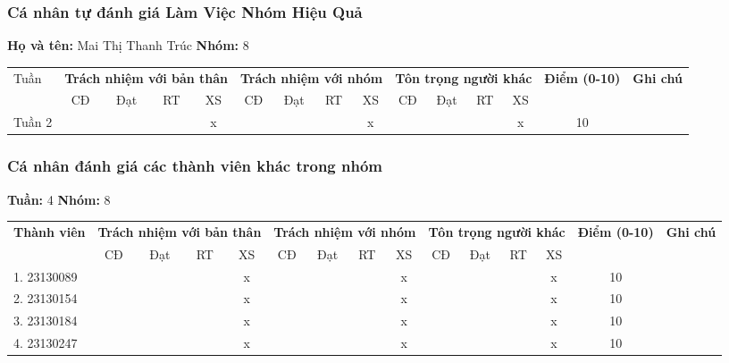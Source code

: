 \subsubsection*{Cá nhân tự đánh giá Làm Việc Nhóm Hiệu Quả}

\noindent \textbf{Họ và tên:} Mai Thị Thanh Trúc \hrulefill \quad \textbf{Nhóm:} 8 \hrulefill

\vspace{0.5cm}

\begin{tabularx}{\linewidth}{|X|c|c|c|c|c|c|c|c|c|c|c|c|c|c|}
\hline
Tuần & \multicolumn{4}{c|}{\textbf{Trách nhiệm với bản thân}} & \multicolumn{4}{c|}{\textbf{Trách nhiệm với nhóm}} & \multicolumn{4}{c|}{\textbf{Tôn trọng người khác}} & \multirow{2}{1.5cm}{\textbf{Điểm (0-10)}} & \multirow{2}{1.5cm}{\textbf{Ghi chú}} \\ \cline{2-13}
 & CĐ & Đạt & RT & XS & CĐ & Đạt & RT & XS & CĐ & Đạt & RT & XS & & \\ \hline
  Tuần 2 & & & & x & & & & x & & & & x & 10 & \\ \hline
\end{tabularx}

\vspace{1cm}

\subsubsection*{Cá nhân đánh giá các thành viên khác trong nhóm}

\noindent \textbf{Tuần:} 4 \hrulefill \quad \textbf{Nhóm:} 8 \hrulefill

\vspace{0.5cm}

\begin{tabularx}{\linewidth}{|X|c|c|c|c|c|c|c|c|c|c|c|c|c|c|}
\hline
\multirow{2}{3cm}{\textbf{Thành viên}} & \multicolumn{4}{c|}{\textbf{Trách nhiệm với bản thân}} & \multicolumn{4}{c|}{\textbf{Trách nhiệm với nhóm}} & \multicolumn{4}{c|}{\textbf{Tôn trọng người khác}} & \multirow{2}{1.2cm}{\textbf{Điểm (0-10)}} & \multirow{2}{1.5cm}{\textbf{Ghi chú}} \\ \cline{2-13}
 & CĐ & Đạt & RT & XS & CĐ & Đạt & RT & XS & CĐ & Đạt & RT & XS & & \\ \hline
1. 23130089 & & & & x & & & & x & & & & x & 10 & \\ \hline
2. 23130154 & & & & x & & & & x & & & & x & 10 & \\ \hline
3. 23130184 & & & & x & & & & x & & & & x & 10 & \\ \hline
4. 23130247 & & & & x & & & & x & & & & x & 10 & \\ \hline
\end{tabularx}
